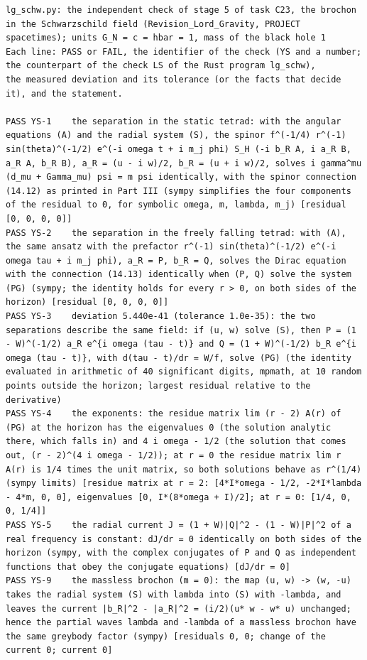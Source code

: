 \documentclass[
  10pt,
]{article}
\begin{document}
\begin{verbatim}
lg_schw.py: the independent check of stage 5 of task C23, the brochon in the Schwarzschild field (Revision_Lord_Gravity, PROJECT spacetimes); units G_N = c = hbar = 1, mass of the black hole 1
Each line: PASS or FAIL, the identifier of the check (YS and a number; the counterpart of the check LS of the Rust program lg_schw),
the measured deviation and its tolerance (or the facts that decide it), and the statement.

PASS YS-1    the separation in the static tetrad: with the angular equations (A) and the radial system (S), the spinor f^(-1/4) r^(-1) sin(theta)^(-1/2) e^(-i omega t + i m_j phi) S_H (-i b_R A, i a_R B, a_R A, b_R B), a_R = (u - i w)/2, b_R = (u + i w)/2, solves i gamma^mu (d_mu + Gamma_mu) psi = m psi identically, with the spinor connection (14.12) as printed in Part III (sympy simplifies the four components of the residual to 0, for symbolic omega, m, lambda, m_j) [residual [0, 0, 0, 0]]
PASS YS-2    the separation in the freely falling tetrad: with (A), the same ansatz with the prefactor r^(-1) sin(theta)^(-1/2) e^(-i omega tau + i m_j phi), a_R = P, b_R = Q, solves the Dirac equation with the connection (14.13) identically when (P, Q) solve the system (PG) (sympy; the identity holds for every r > 0, on both sides of the horizon) [residual [0, 0, 0, 0]]
PASS YS-3    deviation 5.440e-41 (tolerance 1.0e-35): the two separations describe the same field: if (u, w) solve (S), then P = (1 - W)^(-1/2) a_R e^{i omega (tau - t)} and Q = (1 + W)^(-1/2) b_R e^{i omega (tau - t)}, with d(tau - t)/dr = W/f, solve (PG) (the identity evaluated in arithmetic of 40 significant digits, mpmath, at 10 random points outside the horizon; largest residual relative to the derivative)
PASS YS-4    the exponents: the residue matrix lim (r - 2) A(r) of (PG) at the horizon has the eigenvalues 0 (the solution analytic there, which falls in) and 4 i omega - 1/2 (the solution that comes out, (r - 2)^(4 i omega - 1/2)); at r = 0 the residue matrix lim r A(r) is 1/4 times the unit matrix, so both solutions behave as r^(1/4) (sympy limits) [residue matrix at r = 2: [4*I*omega - 1/2, -2*I*lambda - 4*m, 0, 0], eigenvalues [0, I*(8*omega + I)/2]; at r = 0: [1/4, 0, 0, 1/4]]
PASS YS-5    the radial current J = (1 + W)|Q|^2 - (1 - W)|P|^2 of a real frequency is constant: dJ/dr = 0 identically on both sides of the horizon (sympy, with the complex conjugates of P and Q as independent functions that obey the conjugate equations) [dJ/dr = 0]
PASS YS-9    the massless brochon (m = 0): the map (u, w) -> (w, -u) takes the radial system (S) with lambda into (S) with -lambda, and leaves the current |b_R|^2 - |a_R|^2 = (i/2)(u* w - w* u) unchanged; hence the partial waves lambda and -lambda of a massless brochon have the same greybody factor (sympy) [residuals 0, 0; change of the current 0; current 0]

\end{verbatim}
\end{document}
